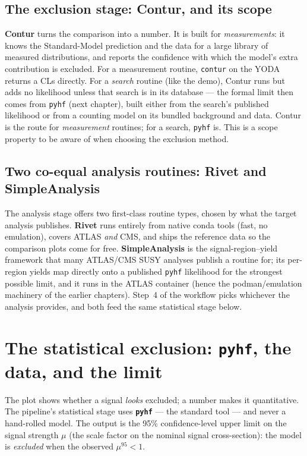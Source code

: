 \documentclass[11pt,oneside]{report}
\newcommand{\code}[1]{\texttt{#1}}
\begin{document}
\section{The exclusion stage: Contur, and its scope}
\textbf{Contur} turns the comparison into a number. It is built for \emph{measurements}: it knows the
Standard-Model prediction and the data for a large library of measured distributions, and reports the
confidence with which the model's extra contribution is excluded. For a measurement routine,
\code{contur} on the YODA returns a CLs directly. For a \emph{search} routine (like the demo), Contur
runs but adds no likelihood unless that search is in its database --- the formal limit then comes from
\texttt{pyhf} (next chapter), built either from the search's published likelihood or from a counting
model on its bundled background and data. Contur is the route for \emph{measurement} routines; for a
search, \texttt{pyhf} is. This is a scope property to be aware of when choosing the exclusion method.

\section{Two co-equal analysis routines: Rivet and SimpleAnalysis}
The analysis stage offers two first-class routine types, chosen by what the target analysis publishes.
\textbf{Rivet} runs entirely from native conda tools (fast, no emulation), covers ATLAS \emph{and}
CMS, and ships the reference data so the comparison plots come for free. \textbf{SimpleAnalysis} is
the signal-region--yield framework that many ATLAS/CMS SUSY analyses publish a routine for; its
per-region yields map directly onto a published \texttt{pyhf} likelihood for the strongest possible
limit, and it runs in the ATLAS container (hence the podman/emulation machinery of the earlier
chapters). Step~4 of the workflow picks whichever the analysis provides, and both feed the same
statistical stage below.

\chapter{The statistical exclusion: \texttt{pyhf}, the data, and the limit}
The plot shows whether a signal \emph{looks} excluded; a number makes it quantitative. The pipeline's
statistical stage uses \textbf{\texttt{pyhf}} --- the standard tool --- and never a hand-rolled model.
The output is the 95\% confidence-level upper limit on the signal strength $\mu$ (the scale factor on
the nominal signal cross-section): the model is \emph{excluded} when the observed $\mu^{95}<1$.
\end{document}
